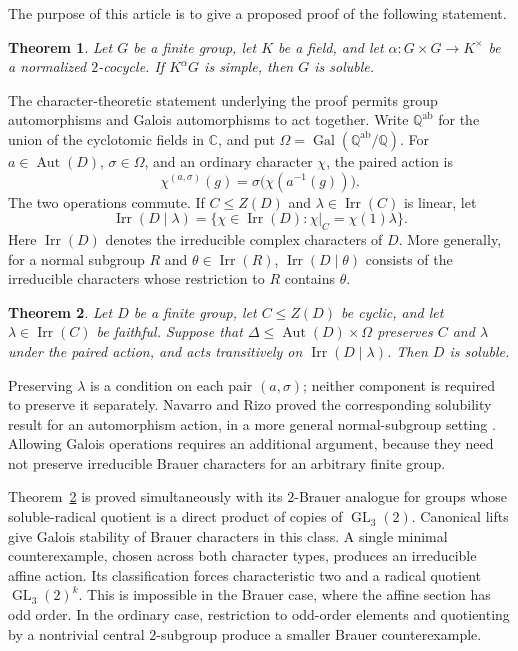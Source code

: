 \documentclass[11pt,a4paper]{amsart}
\DeclareMathOperator{\Irr}{Irr}
\DeclareMathOperator{\Aut}{Aut}
\DeclareMathOperator{\Gal}{Gal}
\DeclareMathOperator{\GL}{GL}
\newtheorem{theorem}{Theorem}[section]
\theoremstyle{remark}
\numberwithin{equation}{section}
\begin{document}
The purpose of this article is to give a proposed proof of the following
statement.

\begin{theorem}\label{thm:main}
Let $G$ be a finite group, let $K$ be a field, and let
$\alpha:G\times G\longrightarrow K^\times$ be a normalized $2$-cocycle.
If $K^\alpha G$ is simple, then $G$ is soluble.
\end{theorem}

The character-theoretic statement underlying the proof permits group
automorphisms and Galois automorphisms to act together. Write
$\mathbb Q^{\mathrm{ab}}$ for the union of the cyclotomic fields in
$\mathbb C$, and put
$\Omega=\Gal(\mathbb Q^{\mathrm{ab}}/\mathbb Q)$.
For $a\in\Aut(D)$, $\sigma\in\Omega$, and an ordinary character $\chi$,
the paired action is
\[
 \chi^{(a,\sigma)}(g)=\sigma\bigl(\chi(a^{-1}(g))\bigr).
\]
The two operations commute. If $C\leq Z(D)$ and
$\lambda\in\Irr(C)$ is linear, let
\[
 \Irr(D\mid\lambda)
 =\{\chi\in\Irr(D):\chi|_C=\chi(1)\lambda\}.
\]
Here $\Irr(D)$ denotes the irreducible complex characters of $D$.
More generally, for a normal subgroup $R$ and $\theta\in\Irr(R)$,
$\Irr(D\mid\theta)$ consists of the irreducible characters whose
restriction to $R$ contains $\theta$.

\begin{theorem}\label{thm:ordinary}
Let $D$ be a finite group, let $C\leq Z(D)$ be cyclic, and let
$\lambda\in\Irr(C)$ be faithful. Suppose that
$\Delta\leq\Aut(D)\times\Omega$ preserves $C$ and $\lambda$ under
the paired action, and acts transitively on $\Irr(D\mid\lambda)$.
Then $D$ is soluble.
\end{theorem}

Preserving $\lambda$ is a condition on each pair $(a,\sigma)$;
neither component is required to preserve it separately.
Navarro and Rizo proved the corresponding solubility result for an
automorphism action, in a more general normal-subgroup setting
\cite[Theorem~A]{NavarroRizo}. Allowing Galois operations requires an
additional argument, because they need not preserve irreducible
Brauer characters for an arbitrary finite group.

Theorem~\ref{thm:ordinary} is proved simultaneously with its
$2$-Brauer analogue for groups whose soluble-radical quotient is a
direct product of copies of $\GL_3(2)$. Canonical lifts give Galois
stability of Brauer characters in this class. A single minimal
counterexample, chosen across both character types, produces an
irreducible affine action. Its classification forces characteristic
two and a radical quotient $\GL_3(2)^k$. This is impossible in the
Brauer case, where the affine section has odd order. In the ordinary
case, restriction to odd-order elements and quotienting by a
nontrivial central $2$-subgroup produce a smaller Brauer counterexample.
\end{document}
